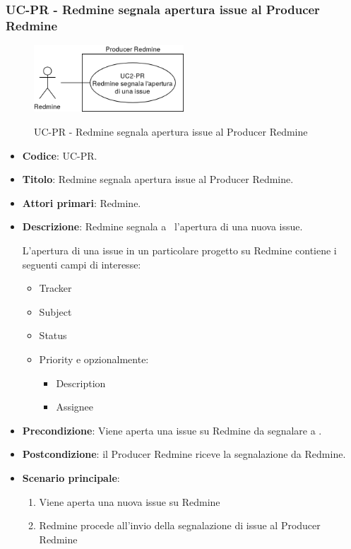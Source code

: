 \subsubsection{UC\theuccount-PR - Redmine segnala apertura issue al Producer Redmine}
    \begin{figure}[H]
		\centering
		\includegraphics[width=0.5\textwidth]{img/casi_d'uso/UC2.png}\\
		\caption{UC\theuccount-PR - Redmine segnala apertura issue al Producer Redmine}
	\end{figure}
	\begin{itemize}
		\item \textbf{Codice}: UC\theuccount-PR.
		\item \textbf{Titolo}: Redmine segnala apertura issue al Producer Redmine.
		\item \textbf{Attori primari}: Redmine.
		\item \textbf{Descrizione}: Redmine segnala a \progetto\ l'apertura di una nuova issue.
		
		L'apertura di una issue in un particolare progetto su Redmine contiene i seguenti campi di interesse:
		 \begin{itemize}
		 	\item Tracker
		 	\item Subject
		 	\item Status
		 	\item Priority e opzionalmente:
		 	\begin{itemize}
		 		\item Description
		 		\item Assignee
		 	\end{itemize}
		 \end{itemize}
		\item \textbf{Precondizione}: Viene aperta una issue su Redmine da
		segnalare a \progetto.
		\item \textbf{Postcondizione}: il Producer Redmine riceve la segnalazione da Redmine.
		\item \textbf{Scenario principale}: 
		\begin{enumerate}
			\item Viene aperta una nuova issue su Redmine
			\item Redmine procede all'invio della segnalazione di issue al Producer Redmine
		\end{enumerate}
		
	\end{itemize}
